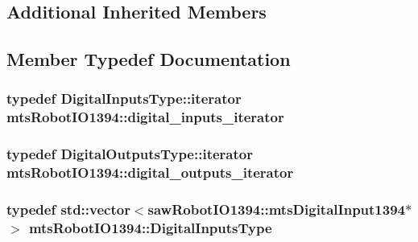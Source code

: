 \subsection*{Additional Inherited Members}


\subsection{Member Typedef Documentation}
\hypertarget{classmts_robot_i_o1394_abd444ca2070d97fbd3c0d7d23049efcc}{
\subsubsection[{digital\-\_\-inputs\-\_\-iterator}]{\setlength{\rightskip}{0pt plus 5cm}typedef Digital\-Inputs\-Type\-::iterator {\bf mts\-Robot\-I\-O1394\-::digital\-\_\-inputs\-\_\-iterator}\hspace{0.3cm}{\ttfamily [protected]}}}\label{classmts_robot_i_o1394_abd444ca2070d97fbd3c0d7d23049efcc}
\hypertarget{classmts_robot_i_o1394_a48bc60cd954bf3778f58163beb05985a}{
\subsubsection[{digital\-\_\-outputs\-\_\-iterator}]{\setlength{\rightskip}{0pt plus 5cm}typedef Digital\-Outputs\-Type\-::iterator {\bf mts\-Robot\-I\-O1394\-::digital\-\_\-outputs\-\_\-iterator}\hspace{0.3cm}{\ttfamily [protected]}}}\label{classmts_robot_i_o1394_a48bc60cd954bf3778f58163beb05985a}
\hypertarget{classmts_robot_i_o1394_ad8b711c653d6fc68084cbe7817e066b9}{
\subsubsection[{Digital\-Inputs\-Type}]{\setlength{\rightskip}{0pt plus 5cm}typedef std\-::vector$<$saw\-Robot\-I\-O1394\-::mts\-Digital\-Input1394$\ast$$>$ {\bf mts\-Robot\-I\-O1394\-::\-Digital\-Inputs\-Type}\hspace{0.3cm}{\ttfamily [protected]}}}\label{classmts_robot_i_o1394_ad8b711c653d6fc68084cbe7817e066b9}

